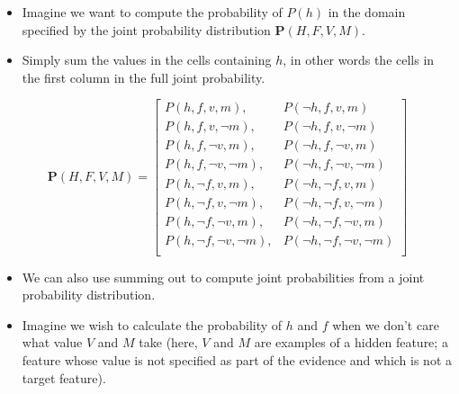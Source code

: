 \documentclass[xcolor={table}]{beamer}
\begin{document}
\begin{frame}
\begin{example}
\begin{itemize}
	\item Imagine we want to compute the probability of $P(h)$ in the domain specified by the joint probability distribution $\mathbf{P}(H,F,V,M)$. 
	\item Simply sum the values in the cells containing $h$,  in other words the cells in the first column in the full joint probability.
\end{itemize}
\begin{equation*}
\mathbf{P}(H,F,V,M) = \left[ \begin{array}{ll} 
P(h, f, v, m),& P(\lnot h, f, v, m)\\
P(h, f, v, \lnot m),& P(\lnot h, f, v, \lnot m)\\
P(h, f, \lnot v, m),& P(\lnot h, f, \lnot v, m)\\
P(h, f, \lnot v, \lnot m),& P(\lnot h, f, \lnot v, \lnot m)\\
P(h, \lnot f, v, m),& P(\lnot h, \lnot f, v, m)\\
P(h, \lnot f, v, \lnot m),& P(\lnot h, \lnot f, v, \lnot m)\\
P(h, \lnot f, \lnot v, m),& P(\lnot h, \lnot f, \lnot v, m) \\
P(h, \lnot f, \lnot v, \lnot m),& P(\lnot h, \lnot f, \lnot v, \lnot m) \\ \end{array} \right]
\label{eq:jointprobABC}
\end{equation*}
\end{example}
\end{frame}



\begin{frame}
\begin{itemize}
	\item We can also use summing out to compute joint probabilities from a joint probability distribution.
\end{itemize}
\begin{example}
\begin{itemize}
	\item Imagine we wish to calculate the probability of $h$ and $f$ when we don't care what value $V$ and $M$ take (here, $V$ and $M$ are examples of a \alert{hidden feature}; a feature whose value is not specified as part of the evidence and which is not a target feature). 
\end{itemize}
\end{example}
\end{frame}
\end{document}
